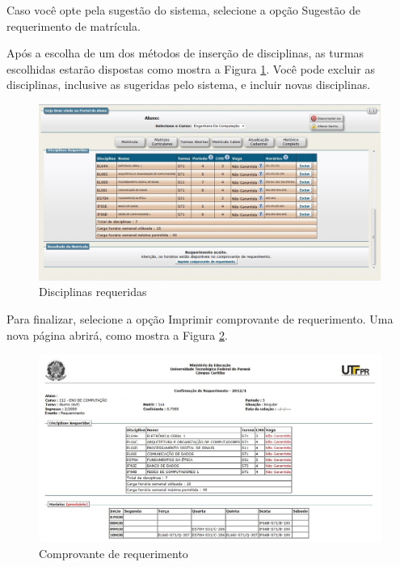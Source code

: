 \documentclass[a4paper,12pt,openany]{article}
\begin{document}
\newpage
Caso você opte pela sugestão do sistema, selecione a opção Sugestão de requerimento de matrícula. 

Após a escolha de um dos métodos de inserção de disciplinas, as turmas escolhidas estarão dispostas como mostra a Figura \ref{disciplinasAdicionadas}. Você pode excluir as disciplinas, inclusive as sugeridas pelo sistema, e incluir novas disciplinas.

	\begin{figure}[ht!] \centering
		\includegraphics[scale=0.45]{mat8.jpg}
		\caption{Disciplinas requeridas}
		\label{disciplinasAdicionadas}
	\end{figure}



\newpage
Para finalizar, selecione a opção Imprimir comprovante de requerimento. Uma nova página abrirá, como mostra a Figura \ref{comprovanteRequerimento}.

	\begin{figure}[ht!] \centering
		\includegraphics[scale=0.45]{mat10.jpg}
		\caption{Comprovante de requerimento}
		\label{comprovanteRequerimento}
	\end{figure}
\end{document}
